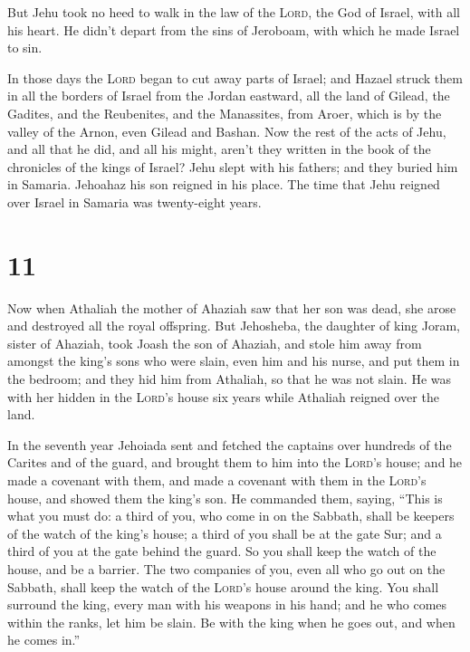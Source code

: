  But Jehu took no heed to walk in the law of the
\textsc{Lord}, the God of Israel, with all his heart. He didn't depart
from the sins of Jeroboam, with which he made Israel to sin.

 In those days the \textsc{Lord} began to cut away parts
of Israel; and Hazael struck them in all the borders of Israel
 from the Jordan eastward, all the land of Gilead, the
Gadites, and the Reubenites, and the Manassites, from Aroer, which is by
the valley of the Arnon, even Gilead and Bashan.  Now the
rest of the acts of Jehu, and all that he did, and all his might, aren't
they written in the book of the chronicles of the kings of Israel?
 Jehu slept with his fathers; and they buried him in
Samaria. Jehoahaz his son reigned in his place.  The time
that Jehu reigned over Israel in Samaria was twenty-eight years.

\hypertarget{section-10}{%
\section{11}\label{section-10}}

 Now when Athaliah the mother of Ahaziah saw that her son
was dead, she arose and destroyed all the royal offspring.
 But Jehosheba, the daughter of king Joram, sister of
Ahaziah, took Joash the son of Ahaziah, and stole him away from amongst
the king's sons who were slain, even him and his nurse, and put them in
the bedroom; and they hid him from Athaliah, so that he was not slain.
 He was with her hidden in the \textsc{Lord}'s house six
years while Athaliah reigned over the land.

 In the seventh year Jehoiada sent and fetched the
captains over hundreds of the Carites and of the guard, and brought them
to him into the \textsc{Lord}'s house; and he made a covenant with them,
and made a covenant with them in the \textsc{Lord}'s house, and showed
them the king's son.  He commanded them, saying, ``This is
what you must do: a third of you, who come in on the Sabbath, shall be
keepers of the watch of the king's house;  a third of you
shall be at the gate Sur; and a third of you at the gate behind the
guard. So you shall keep the watch of the house, and be a barrier.
 The two companies of you, even all who go out on the
Sabbath, shall keep the watch of the \textsc{Lord}'s house around the
king.  You shall surround the king, every man with his
weapons in his hand; and he who comes within the ranks, let him be
slain. Be with the king when he goes out, and when he comes in.''

